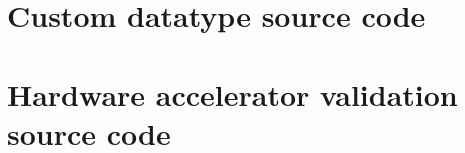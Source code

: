 \documentclass[11pt]{report}
\begin{document}
\begin{appendices}
        \begin{singlespace}
            
        \end{singlespace}
       
     \chapter{Custom datatype source code}
        \begin{singlespace}
            
        \end{singlespace}    
        
      \chapter{Hardware accelerator validation source code}
        \begin{singlespace}
            
        \end{singlespace}  

\end{appendices}
\end{document}
